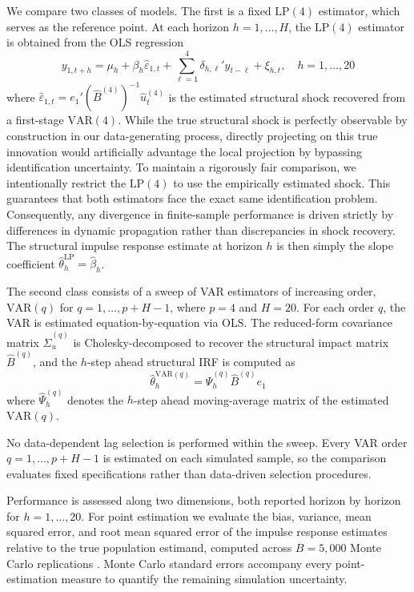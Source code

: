 We compare two classes of models. The first is a fixed $\text{LP}(4)$ estimator, 
which serves as the reference point. At each horizon $h = 1, \ldots, H$, the 
$\text{LP}(4)$ estimator is obtained from the OLS regression
\begin{equation}
    y_{1,t+h} = \mu_h + \beta_h \hat{\varepsilon}_{1,t} + \sum_{\ell=1}^{4} \delta_{h,\ell}' y_{t-\ell} + \xi_{h,t}, \quad h = 1, \ldots, 20
\end{equation}
where $\hat{\varepsilon}_{1,t} = e_1'(\hat{B}^{(4)})^{-1}\hat{u}_t^{(4)}$ is the estimated structural shock recovered from a first-stage $\text{VAR}(4)$. While the true structural shock is perfectly observable by construction in our data-generating process, directly projecting on this true innovation would artificially advantage the local projection by bypassing identification uncertainty. To maintain a rigorously fair comparison, we intentionally restrict the $\text{LP}(4)$ to use the empirically estimated shock. This guarantees that both estimators face the exact same identification problem. Consequently, any divergence in finite-sample performance is driven strictly by differences in dynamic propagation rather than discrepancies in shock recovery. The structural impulse response estimate at horizon $h$ is then simply the slope coefficient $\hat{\theta}_h^{\mathrm{LP}} = \hat{\beta}_h$.

The second class consists of a sweep of VAR estimators of increasing order, 
$\text{VAR}(q)$ for $q = 1, \ldots, p + H - 1$, where $p = 4$ and $H = 20$. For each order 
$q$, the VAR is estimated equation-by-equation via OLS. The reduced-form covariance matrix 
$\hat{\Sigma}_u^{(q)}$ is Cholesky-decomposed to recover the structural impact matrix 
$\hat{B}^{(q)}$, and the $h$-step ahead structural IRF is computed as
\begin{equation}
    \hat{\theta}_h^{\mathrm{VAR}(q)} = \hat{\Psi}_h^{(q)} \hat{B}^{(q)} e_1
\end{equation}
where $\hat{\Psi}_h^{(q)}$ denotes the $h$-step ahead moving-average matrix of the estimated 
$\text{VAR}(q)$. 

No data-dependent lag selection is performed within the sweep. Every VAR order 
$q = 1, \ldots, p + H - 1$ is estimated on each simulated sample, so the comparison evaluates 
fixed specifications rather than data-driven selection procedures.

Performance is assessed along two dimensions, both reported horizon by horizon for $h = 1, 
\ldots, 20$. For point estimation we evaluate the bias, variance, mean squared error, and root 
mean squared error of the impulse response estimates relative to the true population estimand, 
computed across $B = 5{,}000$ Monte Carlo replications \parencite{li2024local}. Monte Carlo 
standard errors accompany every point-estimation measure to quantify the remaining simulation 
uncertainty.

